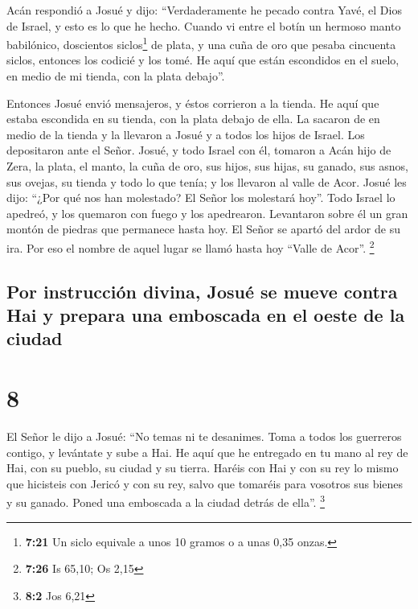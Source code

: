  Acán respondió a Josué y dijo: ``Verdaderamente he
pecado contra Yavé, el Dios de Israel, y esto es lo que he hecho.
 Cuando vi entre el botín un hermoso manto babilónico,
doscientos siclos\footnote{\textbf{7:21} Un siclo equivale a unos 10
  gramos o a unas 0,35 onzas.} de plata, y una cuña de oro que pesaba
cincuenta siclos, entonces los codicié y los tomé. He aquí que están
escondidos en el suelo, en medio de mi tienda, con la plata debajo''.

 Entonces Josué envió mensajeros, y éstos corrieron a la
tienda. He aquí que estaba escondida en su tienda, con la plata debajo
de ella.  La sacaron de en medio de la tienda y la
llevaron a Josué y a todos los hijos de Israel. Los depositaron ante el
Señor.  Josué, y todo Israel con él, tomaron a Acán hijo
de Zera, la plata, el manto, la cuña de oro, sus hijos, sus hijas, su
ganado, sus asnos, sus ovejas, su tienda y todo lo que tenía; y los
llevaron al valle de Acor.  Josué les dijo: ``¿Por qué
nos han molestado? El Señor los molestará hoy''. Todo Israel lo apedreó,
y los quemaron con fuego y los apedrearon.  Levantaron
sobre él un gran montón de piedras que permanece hasta hoy. El Señor se
apartó del ardor de su ira. Por eso el nombre de aquel lugar se llamó
hasta hoy ``Valle de Acor''. \footnote{\textbf{7:26} Is 65,10; Os 2,15}

\hypertarget{por-instrucciuxf3n-divina-josuuxe9-se-mueve-contra-hai-y-prepara-una-emboscada-en-el-oeste-de-la-ciudad}{%
\subsection{Por instrucción divina, Josué se mueve contra Hai y prepara
una emboscada en el oeste de la
ciudad}\label{por-instrucciuxf3n-divina-josuuxe9-se-mueve-contra-hai-y-prepara-una-emboscada-en-el-oeste-de-la-ciudad}}

\hypertarget{section-7}{%
\section{8}\label{section-7}}

 El Señor le dijo a Josué: ``No temas ni te desanimes.
Toma a todos los guerreros contigo, y levántate y sube a Hai. He aquí
que he entregado en tu mano al rey de Hai, con su pueblo, su ciudad y su
tierra.  Haréis con Hai y con su rey lo mismo que
hicisteis con Jericó y con su rey, salvo que tomaréis para vosotros sus
bienes y su ganado. Poned una emboscada a la ciudad detrás de ella''.
\footnote{\textbf{8:2} Jos 6,21}

